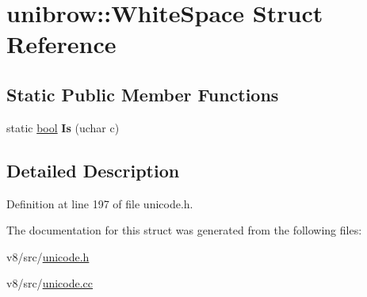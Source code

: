 \hypertarget{structunibrow_1_1WhiteSpace}{}\section{unibrow\+:\+:White\+Space Struct Reference}
\label{structunibrow_1_1WhiteSpace}
\subsection*{Static Public Member Functions}
\begin{DoxyCompactItemize}
\item 
\mbox{\label{structunibrow_1_1WhiteSpace_a1bb2745e2cd1b5d6d59c5527a70f55b5}} 
static \mbox{\hyperlink{classbool}{bool}} {\bfseries Is} (uchar c)
\end{DoxyCompactItemize}


\subsection{Detailed Description}


Definition at line 197 of file unicode.\+h.



The documentation for this struct was generated from the following files\+:\begin{DoxyCompactItemize}
\item 
v8/src/\mbox{\hyperlink{unicode_8h}{unicode.\+h}}\item 
v8/src/\mbox{\hyperlink{unicode_8cc}{unicode.\+cc}}\end{DoxyCompactItemize}

